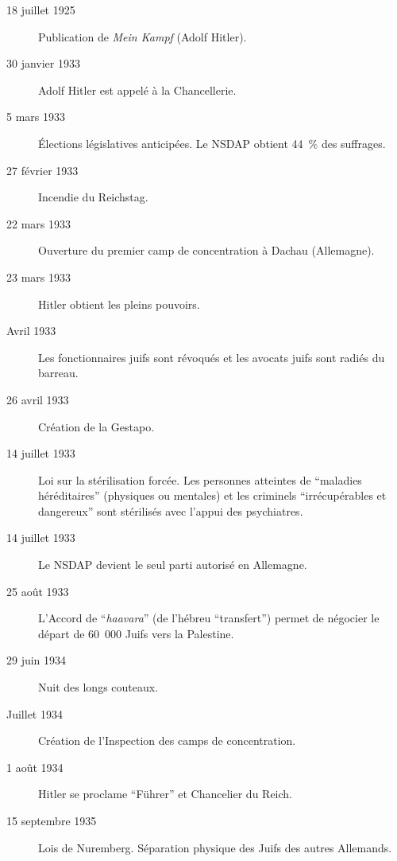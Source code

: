 \begin{description}
    \item[18 juillet 1925] Publication de \textit{Mein Kampf} (Adolf Hitler).
    
    \item[30 janvier 1933] Adolf Hitler est appelé à la Chancellerie.
    
    \item[5 mars 1933] Élections législatives anticipées. Le NSDAP obtient 44~\%{} des suffrages.
    
    \item[27 février 1933] Incendie du Reichstag. 
    
    \item[22 mars 1933] Ouverture du premier camp de concentration à Dachau (Allemagne).
    
    \item[23 mars 1933] Hitler obtient les pleins pouvoirs.

    \item[Avril 1933] Les fonctionnaires juifs sont révoqués et les avocats juifs sont radiés du barreau.
    
    \item[26 avril 1933] Création de la Gestapo.

    \item[14 juillet 1933] Loi sur la stérilisation forcée. Les personnes atteintes de \enquote{maladies héréditaires} (physiques ou mentales) et les criminels \enquote{irrécupérables et dangereux} sont stérilisés avec l'appui des psychiatres.

    \item[14 juillet 1933] Le NSDAP devient le seul parti autorisé en Allemagne.

    \item[25 août 1933] L'Accord de \enquote{\textit{haavara}} (de l'hébreu \enquote{transfert}) permet de négocier le départ de 60~000 Juifs vers la Palestine.

    \item[29 juin 1934] Nuit des longs couteaux.
    
    \item[Juillet 1934] Création de l'Inspection des camps de concentration.

    \item[1\ier{} août 1934] Hitler se proclame \enquote{Führer} et Chancelier du Reich.
    
    \item[15 septembre 1935] Lois de Nuremberg. Séparation physique des Juifs des autres Allemands.


\end{description}
